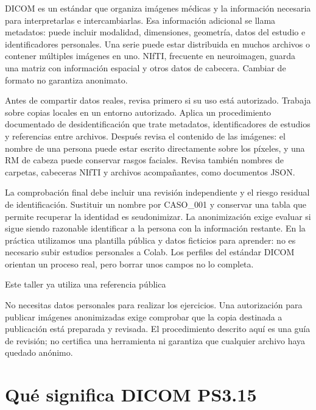 DICOM es un estándar que organiza imágenes médicas y la información necesaria para interpretarlas e intercambiarlas. Esa información adicional se llama metadatos: puede incluir modalidad, dimensiones, geometría, datos del estudio e identificadores personales. Una serie puede estar distribuida en muchos archivos o contener múltiples imágenes en uno. NIfTI, frecuente en neuroimagen, guarda una matriz con información espacial y otros datos de cabecera. Cambiar de formato no garantiza anonimato.


Antes de compartir datos reales, revisa primero si su uso está autorizado. Trabaja sobre copias locales en un entorno autorizado. Aplica un procedimiento documentado de desidentificación que trate metadatos, identificadores de estudios y referencias entre archivos. Después revisa el contenido de las imágenes: el nombre de una persona puede estar escrito directamente sobre los píxeles, y una RM de cabeza puede conservar rasgos faciales. Revisa también nombres de carpetas, cabeceras NIfTI y archivos acompañantes, como documentos JSON.


La comprobación final debe incluir una revisión independiente y el riesgo residual de identificación. Sustituir un nombre por CASO\_001 y conservar una tabla que permite recuperar la identidad es seudonimizar. La anonimización exige evaluar si sigue siendo razonable identificar a la persona con la información restante. En la práctica utilizamos una plantilla pública y datos ficticios para aprender: no es necesario subir estudios personales a Colab. Los perfiles del estándar DICOM orientan un proceso real, pero borrar unos campos no lo completa.



\begin{Cuidado}{Este taller ya utiliza una referencia pública}

No necesitas datos personales para realizar los ejercicios. Una autorización para publicar imágenes anonimizadas exige comprobar que la copia destinada a publicación está preparada y revisada. El procedimiento descrito aquí es una guía de revisión; no certifica una herramienta ni garantiza que cualquier archivo haya quedado anónimo.


\end{Cuidado}

\section{Qué significa DICOM PS3.15}

